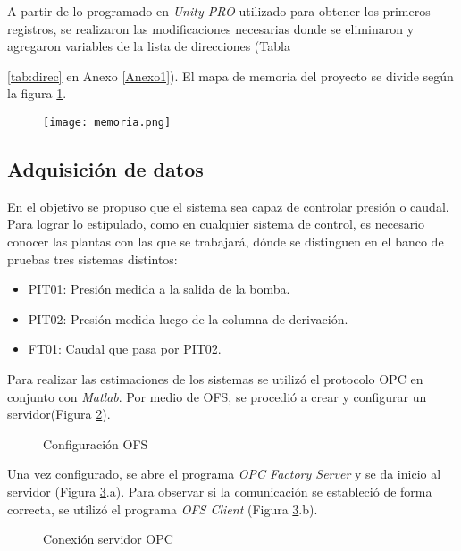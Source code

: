 
A partir de lo programado en \textit{Unity PRO} utilizado para obtener los primeros registros, se realizaron las modificaciones necesarias donde se eliminaron y agregaron variables de la lista de direcciones (Tabla {\ref{tab:direc} en Anexo \ref{Anexo1}). El mapa de memoria del proyecto se divide según la figura \ref{fig:memoria}.
	
\begin{figure}[h!]
	\centering
	\texttt{[image: memoria.png]}
	\label{fig:memoria}
\end{figure}


\subsection{Adquisición de datos}
En el objetivo se propuso que el sistema sea capaz de controlar presión o caudal. Para lograr lo estipulado, como en cualquier sistema de control, es necesario conocer las plantas con las que se trabajará, dónde se distinguen en el banco de pruebas tres sistemas distintos:
\begin{itemize}
	\item PIT01: Presión medida a la salida de la bomba.
	\item PIT02: Presión medida luego de la columna de derivación.
	\item FT01: Caudal que pasa por PIT02.
\end{itemize}

Para realizar las estimaciones de los sistemas se utilizó el protocolo OPC en conjunto con \textit{Matlab}. Por medio de OFS, se procedió a crear y configurar un servidor(Figura \ref{fig:opc1}).

\begin{figure}[htbp]
	\centering
	\caption{Configuración OFS} \label{fig:opc1}
\end{figure}


Una vez configurado, se abre el programa \textit{OPC Factory Server} y se da inicio al servidor (Figura \ref{fig:opc2}.a). Para observar si la comunicación se estableció de forma correcta, se utilizó el programa \textit{OFS Client} (Figura \ref{fig:opc2}.b).

\begin{figure}[htbp]
	\centering
	\caption{Conexión servidor OPC} \label{fig:opc2}
\end{figure}

}
